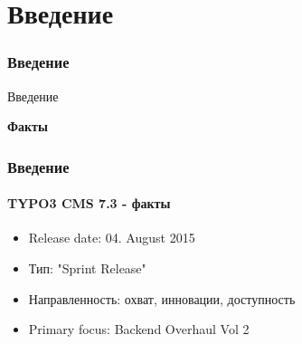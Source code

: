 %

\section{Введение}
\begin{frame}[fragile]
	\frametitle{Введение}

	\begin{center}\huge{Введение}\end{center}
	\begin{center}\huge{\color{typo3darkgrey}\textbf{Факты}}\end{center}

\end{frame}

\begin{frame}[fragile]
	\frametitle{Введение}
	\framesubtitle{TYPO3 CMS 7.3 - факты}

	\begin{itemize}
		\item Release date: 04. August 2015
		\item Тип: "Sprint Release"
		\item Направленность: охват, инновации, доступность
		\item Primary focus: Backend Overhaul Vol 2
	\end{itemize}

\end{frame}

